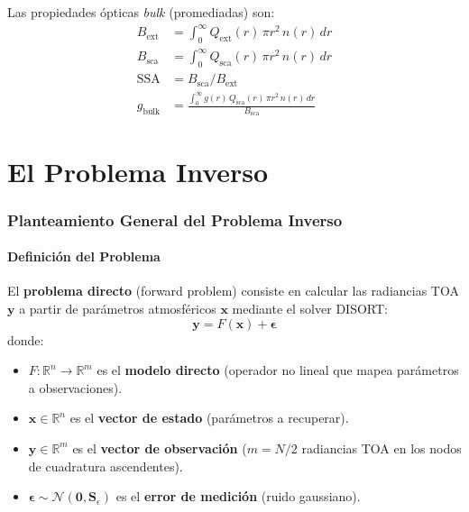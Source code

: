\documentclass[a4paper,11pt]{article}
\begin{document}
Las propiedades \'opticas \emph{bulk} (promediadas) son:
\begin{align}
    B_{\text{ext}} &= \int_0^{\infty} Q_{\text{ext}}(r)\,\pi r^2\,n(r)\,dr\\
    B_{\text{sca}} &= \int_0^{\infty} Q_{\text{sca}}(r)\,\pi r^2\,n(r)\,dr\\
    \text{SSA} &= B_{\text{sca}} / B_{\text{ext}}\\
    g_{\text{bulk}} &= \frac{\int_0^{\infty} g(r)\,Q_{\text{sca}}(r)\,\pi r^2\,n(r)\,dr}{B_{\text{sca}}}
\end{align}


\part{El Problema Inverso}


\section{Planteamiento General del Problema Inverso}

\subsection{Definici\'on del Problema}

El \textbf{problema directo} (forward problem) consiste en calcular las
radiancias TOA $\mathbf{y}$ a partir de par\'ametros atmosf\'ericos
$\mathbf{x}$ mediante el solver DISORT:
\begin{equation}
    \mathbf{y} = F(\mathbf{x}) + \bm{\epsilon}
\end{equation}
donde:
\begin{itemize}
    \item $F: \mathbb{R}^n \to \mathbb{R}^m$ es el \textbf{modelo directo}
          (operador no lineal que mapea par\'ametros a observaciones).
    \item $\mathbf{x} \in \mathbb{R}^n$ es el \textbf{vector de estado}
          (par\'ametros a recuperar).
    \item $\mathbf{y} \in \mathbb{R}^m$ es el \textbf{vector de observaci\'on}
          ($m = N/2$ radiancias TOA en los nodos de cuadratura ascendentes).
    \item $\bm{\epsilon} \sim \mathcal{N}(\mathbf{0}, \mathbf{S}_\epsilon)$ es
          el \textbf{error de medici\'on} (ruido gaussiano).
\end{itemize}
\end{document}
